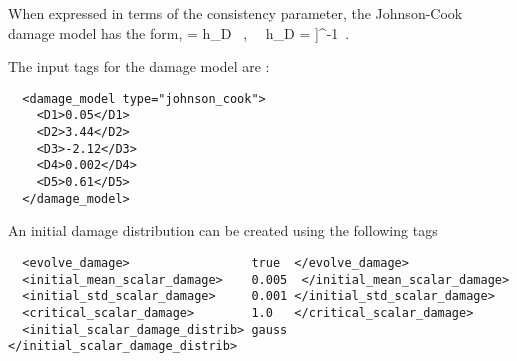 When expressed in terms of the consistency parameter, the Johnson-Cook damage model
has the form,
\Beq
   = \dot{\lambda} h_D ~,~~
  h_D = \left[\left[D_1 + D_2 \exp \left(D_3 \sigma^\star\right)\right]
         
        \right]^{-1} \,.
\Eeq

The input tags for the damage model are :
\lstset{language=XML}
\begin{lstlisting}
  <damage_model type="johnson_cook">
    <D1>0.05</D1>
    <D2>3.44</D2>
    <D3>-2.12</D3>
    <D4>0.002</D4>
    <D5>0.61</D5>
  </damage_model>
\end{lstlisting}

An initial damage distribution can be created using the following tags
\lstset{language=XML}
\begin{lstlisting}
  <evolve_damage>                 true  </evolve_damage>
  <initial_mean_scalar_damage>    0.005  </initial_mean_scalar_damage>
  <initial_std_scalar_damage>     0.001 </initial_std_scalar_damage>
  <critical_scalar_damage>        1.0   </critical_scalar_damage>
  <initial_scalar_damage_distrib> gauss </initial_scalar_damage_distrib>
\end{lstlisting}

